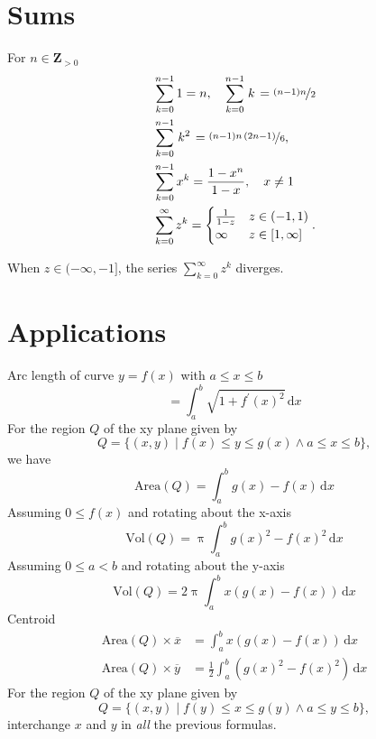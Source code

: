 \documentclass[letterpaper,landscape,9pt,fleqn]{extarticle}
\begin{document}
\begin{multicols*}{4}
\section*{Sums}
\begin{minipage}{0.25\textwidth}
For \(n\in \mathbf{Z}_{>0}\) 
\begin{align*}
    &\sum_{k=0}^{n-1}1 = n, \quad
    \sum_{k=0}^{n-1}{\left. k\right.} =\nicefrac{\left( n-1\right)  n}{2}\\
    &\sum_{k=0}^{n-1}{\left. {{k}^{2}}\right.} =\nicefrac{\left( n-1\right)  n\, \left( 2 n-1\right) }{6}, \\
    &\sum_{k=0}^{n-1} x^k = \frac{1-x^n}{1-x}, \quad  x \neq 1 \\
    &\sum_{k=0}^\infty z^k = \begin{cases} \frac{1}{1-z} & z \in (-1,1) \\
                                      \infty & z \in [1,\infty] 
\end{cases}.
   \end{align*}

   When $z \in (-\infty, -1]$, the series $\sum_{k=0}^\infty z^k$ diverges.
 \end{minipage}
 \vspace{0.25in}
 \section*{Applications}
Arc length of curve \(y = f(x)\) with \(a \leq x \leq b\)
\[
   = \int_a^b \sqrt{1 + f^\prime(x)^2} \, \mathrm{d} x
\]
For the region \(Q\) of the xy plane given by
\[
   Q = \{(x,y) \mid f(x) \leq y \leq g(x) \land a \leq x \leq b \},
\]
we have
\[
  \mbox{Area}(Q) = \int_a^b g(x) - f(x) \, \mathrm{d} x
\]  
Assuming \(0 \leq f(x)\) and rotating about the \mbox{x-axis}
\[
  \mbox{Vol}(Q) = \uppi \int_a^b g(x)^2 - f(x)^2 \, \mathrm{d} x
\]
Assuming \(0 \leq a < b\) and rotating about the y-axis
\[
  \mbox{Vol}(Q) = 2 \uppi \int_a^b x (g(x)  - f(x)) \, \mathrm{d} x
\]
Centroid
\begin{align*}
    \mbox{Area}(Q) \times \overline{x} &=  \int_a^b x \left(g(x) - f(x) \right) \, \mathrm{d} x \\
     \mbox{Area}(Q) \times \overline{y} &=  \frac{1}{2} \int_a^b  \left (g(x)^2  - f(x)^2 \right) \, \mathrm{d} x
\end{align*}
For the region \(Q\) of the xy plane given by
\[
   Q = \{(x,y) \mid f(y) \leq x \leq g(y) \land a \leq y \leq b \},
\]
interchange \(x\) and \(y\) in \emph{all} the previous formulas. 



\end{multicols*}
\end{document}
